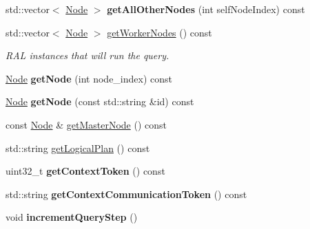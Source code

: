 \begin{DoxyCompactItemize}
std\+::vector$<$ \hyperlink{classblazingdb_1_1transport_1_1Node}{Node} $>$ {\bfseries get\+All\+Other\+Nodes} (int self\+Node\+Index) const
\item 
\mbox{\label{classblazingdb_1_1manager_1_1Context_a4aa25b97a3c3e96e10947f519d171b35}} 
std\+::vector$<$ \hyperlink{classblazingdb_1_1transport_1_1Node}{Node} $>$ \hyperlink{classblazingdb_1_1manager_1_1Context_a4aa25b97a3c3e96e10947f519d171b35}{get\+Worker\+Nodes} () const
\begin{DoxyCompactList}\small\item\em R\+AL instances that will run the query. \end{DoxyCompactList}\item 
\mbox{\label{classblazingdb_1_1manager_1_1Context_af31d1d36d220e0d84f30280f18c0dab1}} 
\hyperlink{classblazingdb_1_1transport_1_1Node}{Node} {\bfseries get\+Node} (int node\+\_\+index) const
\item 
\mbox{\label{classblazingdb_1_1manager_1_1Context_a825bc87492256cd9c0edad4ee8b1928a}} 
\hyperlink{classblazingdb_1_1transport_1_1Node}{Node} {\bfseries get\+Node} (const std\+::string \&id) const
\item 
const \hyperlink{classblazingdb_1_1transport_1_1Node}{Node} \& \hyperlink{classblazingdb_1_1manager_1_1Context_ad1faee75fb1b10af373d6481ae621dfd}{get\+Master\+Node} () const
\item 
std\+::string \hyperlink{classblazingdb_1_1manager_1_1Context_ae0093ffa619c372c6130af7e3c77c372}{get\+Logical\+Plan} () const
\item 
\mbox{\label{classblazingdb_1_1manager_1_1Context_a8e4398b9941b94007cae1b5c53a35008}} 
uint32\+\_\+t {\bfseries get\+Context\+Token} () const
\item 
\mbox{\label{classblazingdb_1_1manager_1_1Context_aea67cc180a62a0ae6772ecdbe67e941a}} 
std\+::string {\bfseries get\+Context\+Communication\+Token} () const
\item 
\mbox{\label{classblazingdb_1_1manager_1_1Context_a96fe3bf29e74bb9ed00f0062eda99676}} 
void {\bfseries increment\+Query\+Step} ()

\end{DoxyCompactItemize}
